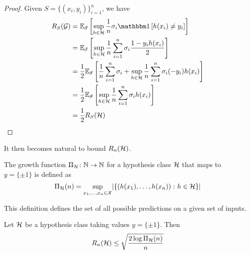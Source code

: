 \begin{proof}
    Given \(S = \{(x_i, y_i)\}_{i=1}^n\), we have 
    \begin{align*}
        R_S(\G) &= \expec_{\vec{\sigma}} \midBrac{ \sup_{h \in \Hcal} \frac{1}{n} \sigma_i \indi \midBrac{h(x_i) \neq y_i} }  \\
        &= \expec_{\vec{\sigma}} \midBrac{\sup_{h \in \Hcal} \frac{1}{n} \sum_{i=1}^n \sigma_i 
        \frac{1 - y_i h(x_i)}{2}} \\
        &= \frac{1}{2} \expec_{\vec{\sigma}} \midBrac{ \frac{1}{n} \sum_{i=1}^n \sigma_i 
        + \sup_{h \in \Hcal} \frac{1}{n} \sum_{i=1}^n \sigma_i (-y_i) h(x_i) } \\ 
        &= \frac{1}{2} \expec_{\vec{\sigma}} \midBrac{ \sup_{h \in \Hcal} \frac{1}{n} 
        \sum_{i=1}^n \sigma_i h(x_i) } \\ 
        &= \frac{1}{2} R_S(\Hcal) 
    \end{align*}
\end{proof}

\begin{remark}
    It then becomes natural to bound \(R_n (\mathcal{H})\). 
\end{remark}
\begin{definition} \label{def:growth_function}
    The growth function \(\Pi_{\mathcal{H}} \colon \mathbb{N} \to \mathbb{N}\) for a hypothesis class 
    \(\mathcal{H}\) that maps to \(y = \{\pm 1\}\) is defined as 
    \[
        \Pi_{\mathcal{H}} (n) = \sup_{x_1, \ldots, x_n \in \mathcal{X}} \lvert \{ \left(h(x_1),\ldots, h(x_n)\right) \colon h \in \mathcal{H} \} \rvert  
    \]
\end{definition}

\begin{remark}
    This definition defines the set of all possible predictions on a given set of inputs. 
\end{remark}



\begin{theorem}
    Let \(\mathcal{H}\) be a hypothesis class taking values \(y = \{\pm 1\}\). Then 
    \[
        R_n (\mathcal{H}) \leq \sqrt{ \frac{2 \log \Pi_{\mathcal{H}} (n)}{n} }  
    \]
\end{theorem}

